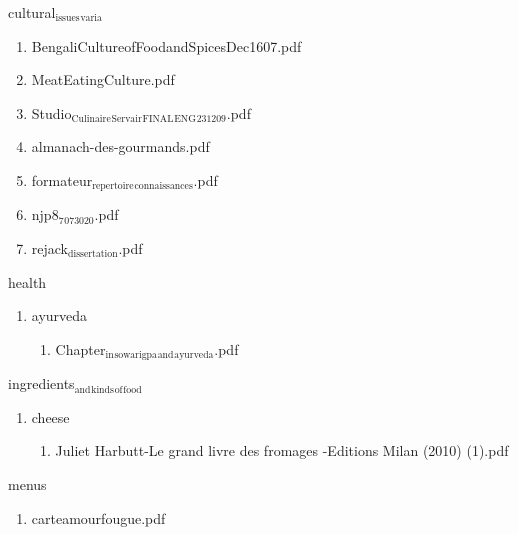 \documentclass[11pt]{article}
\begin{document}
\item cultural$_{\text{issues}}$$_{\text{varia}}$
\label{sec-1-1-1-1-21-4}
\begin{enumerate}
\item BengaliCultureofFoodandSpicesDec1607.pdf
\label{sec-1-1-1-1-21-4-1}

\item MeatEatingCulture.pdf
\label{sec-1-1-1-1-21-4-2}

\item Studio$_{\text{Culinaire}}$$_{\text{Servair}}$$_{\text{FINAL}}$$_{\text{ENG}}$$_{\text{231209}}$.pdf
\label{sec-1-1-1-1-21-4-3}

\item almanach-des-gourmands.pdf
\label{sec-1-1-1-1-21-4-4}

\item formateur$_{\text{repertoire}}$$_{\text{connaissances}}$.pdf
\label{sec-1-1-1-1-21-4-5}

\item njp8$_{\text{7}}$$_{\text{073020}}$.pdf
\label{sec-1-1-1-1-21-4-6}

\item rejack$_{\text{dissertation}}$.pdf
\label{sec-1-1-1-1-21-4-7}
\end{enumerate}

\item health
\label{sec-1-1-1-1-21-5}
\begin{enumerate}
\item ayurveda
\label{sec-1-1-1-1-21-5-1}
\begin{enumerate}
\item Chapter$_{\text{in}}$$_{\text{sowarigpa}}$$_{\text{and}}$$_{\text{ayurveda}}$.pdf
\label{sec-1-1-1-1-21-5-1-1}
\end{enumerate}
\end{enumerate}

\item ingredients$_{\text{and}}$$_{\text{kinds}}$$_{\text{of}}$$_{\text{food}}$
\label{sec-1-1-1-1-21-6}
\begin{enumerate}
\item cheese
\label{sec-1-1-1-1-21-6-1}
\begin{enumerate}
\item Juliet Harbutt-Le grand livre des fromages  -Editions Milan (2010) (1).pdf
\label{sec-1-1-1-1-21-6-1-1}
\end{enumerate}
\end{enumerate}

\item menus
\label{sec-1-1-1-1-21-7}
\begin{enumerate}
\item carteamourfougue.pdf
\label{sec-1-1-1-1-21-7-1}
\end{enumerate}
\end{document}
